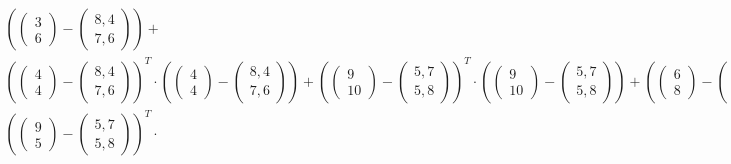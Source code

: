 \documentclass[a4paper,parskip=full-]{article}
\begin{document}
\begin{multline*}
\left( \begin{pmatrix} 3 \\ 6 \end{pmatrix} - \begin{pmatrix} 8,4 \\ 7,6 \end{pmatrix} \right) + \\
\left( \begin{pmatrix} 4 \\ 4 \end{pmatrix} - \begin{pmatrix} 8,4 \\ 7,6 \end{pmatrix} \right)^T \cdot
\left( \begin{pmatrix} 4 \\ 4 \end{pmatrix} - \begin{pmatrix} 8,4 \\ 7,6 \end{pmatrix} \right) + 
\left( \begin{pmatrix}  9 \\ 10 \end{pmatrix} - \begin{pmatrix} 5,7 \\ 5,8 \end{pmatrix} \right)^T \cdot
\left( \begin{pmatrix}  9 \\ 10 \end{pmatrix} - \begin{pmatrix} 5,7 \\ 5,8 \end{pmatrix} \right) +
\left( \begin{pmatrix}  6 \\  8 \end{pmatrix} - \begin{pmatrix} 5,7 \\ 5,8 \end{pmatrix} \right)^T \cdot
\left( \begin{pmatrix}  6 \\  8 \end{pmatrix} - \begin{pmatrix} 5,7 \\ 5,8 \end{pmatrix} \right) + \\
\left( \begin{pmatrix}  9 \\  5 \end{pmatrix} - \begin{pmatrix} 5,7 \\ 5,8 \end{pmatrix} \right)^T \cdot

\end{multline*}
\end{document}
